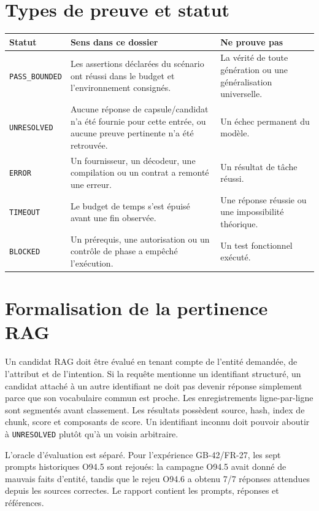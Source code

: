 \documentclass[11pt,a4paper]{article}
\begin{document}
\section{Types de preuve et statut}
\begin{longtable}{p{3.2cm}p{8.7cm}p{2.7cm}}
\toprule
\textbf{Statut} & \textbf{Sens dans ce dossier} & \textbf{Ne prouve pas}\\
\midrule
\texttt{PASS\_BOUNDED} & Les assertions déclarées du scénario ont réussi dans le budget et l'environnement consignés. & La vérité de toute génération ou une généralisation universelle.\\
\texttt{UNRESOLVED} & Aucune réponse de capsule/candidat n'a été fournie pour cette entrée, ou aucune preuve pertinente n'a été retrouvée. & Un échec permanent du modèle.\\
\texttt{ERROR} & Un fournisseur, un décodeur, une compilation ou un contrat a remonté une erreur. & Un résultat de tâche réussi.\\
\texttt{TIMEOUT} & Le budget de temps s'est épuisé avant une fin observée. & Une réponse réussie ou une impossibilité théorique.\\
\texttt{BLOCKED} & Un prérequis, une autorisation ou un contrôle de phase a empêché l'exécution. & Un test fonctionnel exécuté.\\
\bottomrule
\end{longtable}

\section{Formalisation de la pertinence RAG}
Un candidat RAG doit être évalué en tenant compte de l'entité demandée, de l'attribut et de l'intention. Si la requête mentionne un identifiant structuré, un candidat attaché à un autre identifiant ne doit pas devenir réponse simplement parce que son vocabulaire commun est proche. Les enregistrements ligne-par-ligne sont segmentés avant classement. Les résultats possèdent source, hash, index de chunk, score et composants de score. Un identifiant inconnu doit pouvoir aboutir à \texttt{UNRESOLVED} plutôt qu'à un voisin arbitraire.

L'oracle d'évaluation est séparé. Pour l'expérience GB-42/FR-27, les sept prompts historiques O94.5 sont rejoués: la campagne O94.5 avait donné de mauvais faits d'entité, tandis que le rejeu O94.6 a obtenu 7/7 réponses attendues depuis les sources correctes. Le rapport  contient les prompts, réponses et références.
\end{document}
